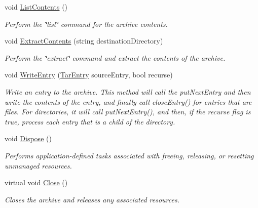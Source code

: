 \begin{DoxyCompactItemize}
void \hyperlink{class_i_c_sharp_code_1_1_sharp_zip_lib_1_1_tar_1_1_tar_archive_a0a45311b31ed0e3f9864fdfb13f44f26}{List\+Contents} ()
\begin{DoxyCompactList}\small\item\em Perform the \char`\"{}list\char`\"{} command for the archive contents. \end{DoxyCompactList}\item 
void \hyperlink{class_i_c_sharp_code_1_1_sharp_zip_lib_1_1_tar_1_1_tar_archive_a0b095bfac3c46eaeafcf53b7a30266e0}{Extract\+Contents} (string destination\+Directory)
\begin{DoxyCompactList}\small\item\em Perform the \char`\"{}extract\char`\"{} command and extract the contents of the archive. \end{DoxyCompactList}\item 
void \hyperlink{class_i_c_sharp_code_1_1_sharp_zip_lib_1_1_tar_1_1_tar_archive_a138d0b26fa976857401c01030533d715}{Write\+Entry} (\hyperlink{class_i_c_sharp_code_1_1_sharp_zip_lib_1_1_tar_1_1_tar_entry}{Tar\+Entry} source\+Entry, bool recurse)
\begin{DoxyCompactList}\small\item\em Write an entry to the archive. This method will call the put\+Next\+Entry and then write the contents of the entry, and finally call close\+Entry() for entries that are files. For directories, it will call put\+Next\+Entry(), and then, if the recurse flag is true, process each entry that is a child of the directory. \end{DoxyCompactList}\item 
void \hyperlink{class_i_c_sharp_code_1_1_sharp_zip_lib_1_1_tar_1_1_tar_archive_a756966758e4d6f3ca9bb9530edac3ea4}{Dispose} ()
\begin{DoxyCompactList}\small\item\em Performs application-\/defined tasks associated with freeing, releasing, or resetting unmanaged resources. \end{DoxyCompactList}\item 
virtual void \hyperlink{class_i_c_sharp_code_1_1_sharp_zip_lib_1_1_tar_1_1_tar_archive_adadd00e0b2726d82c8997c2b8d71c14b}{Close} ()
\begin{DoxyCompactList}\small\item\em Closes the archive and releases any associated resources. \end{DoxyCompactList}\end{DoxyCompactItemize}
